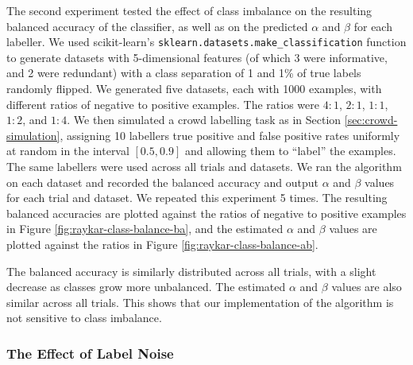             The second experiment tested the effect of class imbalance on the
            resulting balanced accuracy of the classifier, as well as on the
            predicted $\alpha$ and $\beta$ for each labeller. We used
            scikit-learn's \texttt{sklearn.datasets.make\_classification}
            function \citep{scikit-learn} to generate datasets with
            5-dimensional features (of which 3 were informative, and 2 were
            redundant) with a class separation of 1 and 1\% of true labels
            randomly flipped. We generated five datasets, each with 1000
            examples, with different ratios of negative to positive examples.
            The ratios were $4:1$, $2:1$, $1:1$, $1:2$, and $1:4$. We then
            simulated a crowd labelling task as in Section
            \ref{sec:crowd-simulation}, assigning 10 labellers true positive and
            false positive rates uniformly at random in the interval $[0.5,
            0.9]$ and allowing them to ``label'' the examples. The same
            labellers were used across all trials and datasets. We ran the
            \citeauthor{raykar10} algorithm on each dataset and recorded the
            balanced accuracy and output $\alpha$ and $\beta$ values for each
            trial and dataset. We repeated this experiment 5 times. The
            resulting balanced accuracies are plotted against the ratios of
            negative to positive examples in Figure
            \ref{fig:raykar-class-balance-ba}, and the estimated $\alpha$ and
            $\beta$ values are plotted against the ratios in Figure
            \ref{fig:raykar-class-balance-ab}.

            The balanced accuracy is similarly distributed across all trials,
            with a slight decrease as classes grow more unbalanced. The
            estimated $\alpha$ and $\beta$ values are also similar across all
            trials. This shows that our implementation of the
            \citeauthor{raykar10} algorithm is not sensitive to class imbalance.

        \subsubsection{The Effect of Label Noise}

